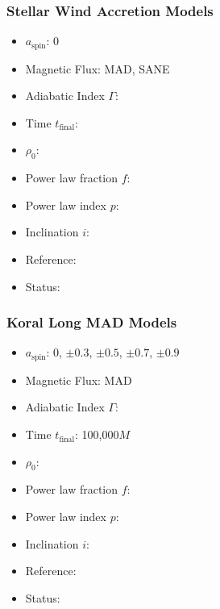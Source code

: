 \subsubsection{Stellar Wind Accretion Models}

\begin{itemize}[noitemsep]
\item $a_\mathrm{spin}$: 0
\item Magnetic Flux: MAD, SANE
\item Adiabatic Index $\Gamma$:
\item Time $t_\mathrm{final}$:
\item $\rho_0$:
\item Power law fraction $f$:
\item Power law index $p$:
\item Inclination $i$:
\item Reference:
\item Status:
\end{itemize}

\subsubsection{Koral Long MAD Models}

\begin{itemize}[noitemsep]
\item $a_\mathrm{spin}$: 0, $\pm0.3$, $\pm0.5$, $\pm0.7$, $\pm0.9$
\item Magnetic Flux: MAD
\item Adiabatic Index $\Gamma$:
\item Time $t_\mathrm{final}$: 100,000$M$
\item $\rho_0$:
\item Power law fraction $f$:
\item Power law index $p$:
\item Inclination $i$:
\item Reference:
\item Status:
\end{itemize}

